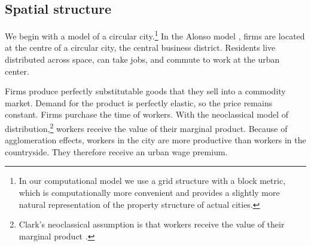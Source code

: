 \subsection{Spatial structure}

%  

We begin with a model of a circular city.\footnote{In our computational model we use a grid structure with  a block metric, which is computationally more convenient and provides a slightly more natural representation of the property structure of actual cities.} %
In the \gls{Alonso model} \cite{alonsoTheoryUrbanLand1960, alonsoLocationLandUse1964}, firms are located at the centre of a circular city, the central business district. Residents live distributed across space, can take jobs, and commute to work at the urban center. 



Firms produce perfectly \gls{substitutable} %
goods that they sell into a commodity market. Demand for the \gls{product} is \gls{perfectly elastic}, so the price remains constant. 
Firms purchase the time of workers. %
With the neoclassical model of distribution,\footnote{Clark's neoclassical assumption is that workers receive the value of their marginal product \cite{clarkDistributionWealthTheory1899}.} 
workers receive the value of their marginal product. 
Because of agglomeration effects, workers in the city are more productive than workers in the countryside. They therefore receive an \gls{urban wage premium}.

